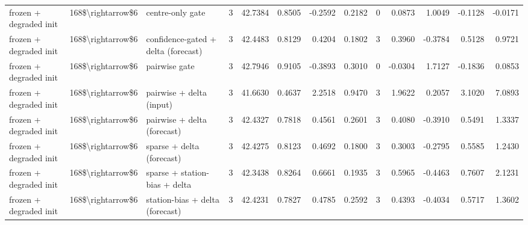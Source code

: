 \begin{table}
\begin{tabular}{lllrrrrrrrrrr}
frozen + degraded init & 168\$\textbackslash rightarrow\$6 & centre-only gate & 3 & 42.7384 & 0.8505 & -0.2592 & 0.2182 & 0 & 0.0873 & 1.0049 & -0.1128 & -0.0171 \\
frozen + degraded init & 168\$\textbackslash rightarrow\$6 & confidence-gated + delta (forecast) & 3 & 42.4483 & 0.8129 & 0.4204 & 0.1802 & 3 & 0.3960 & -0.3784 & 0.5128 & 0.9721 \\
frozen + degraded init & 168\$\textbackslash rightarrow\$6 & pairwise gate & 3 & 42.7946 & 0.9105 & -0.3893 & 0.3010 & 0 & -0.0304 & 1.7127 & -0.1836 & 0.0853 \\
frozen + degraded init & 168\$\textbackslash rightarrow\$6 & pairwise + delta (input) & 3 & 41.6630 & 0.4637 & 2.2518 & 0.9470 & 3 & 1.9622 & 0.2057 & 3.1020 & 7.0893 \\
frozen + degraded init & 168\$\textbackslash rightarrow\$6 & pairwise + delta (forecast) & 3 & 42.4327 & 0.7818 & 0.4561 & 0.2601 & 3 & 0.4080 & -0.3910 & 0.5491 & 1.3337 \\
frozen + degraded init & 168\$\textbackslash rightarrow\$6 & sparse + delta (forecast) & 3 & 42.4275 & 0.8123 & 0.4692 & 0.1800 & 3 & 0.3003 & -0.2795 & 0.5585 & 1.2430 \\
frozen + degraded init & 168\$\textbackslash rightarrow\$6 & sparse + station-bias + delta & 3 & 42.3438 & 0.8264 & 0.6661 & 0.1935 & 3 & 0.5965 & -0.4463 & 0.7607 & 2.1231 \\
frozen + degraded init & 168\$\textbackslash rightarrow\$6 & station-bias + delta (forecast) & 3 & 42.4231 & 0.7827 & 0.4785 & 0.2592 & 3 & 0.4393 & -0.4034 & 0.5717 & 1.3602 \\
\bottomrule
\end{tabular}
\end{table}
